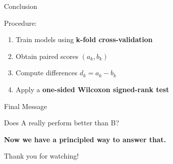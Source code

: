 \documentclass{beamer}
\begin{document}

\begin{frame}{Conclusion}

Procedure:

\begin{enumerate}
\item Train models using \textbf{k-fold cross-validation}
\item Obtain paired scores $(a_k, b_k)$
\item Compute differences $d_k = a_k - b_k$
\item Apply a \textbf{one-sided Wilcoxon signed-rank test}
\end{enumerate}

\bigskip

\begin{algorithm}[H]
\end{algorithm}

\end{frame}


\begin{frame}{Final Message}

\begin{center}
\Large
Does A really perform better than B?
\end{center}

\bigskip

\begin{center}
\Large
\textbf{Now we have a principled way to answer that.}
\end{center}

\bigskip

\begin{center}
Thank you for watching!
\end{center}

\end{frame}

\end{document}
